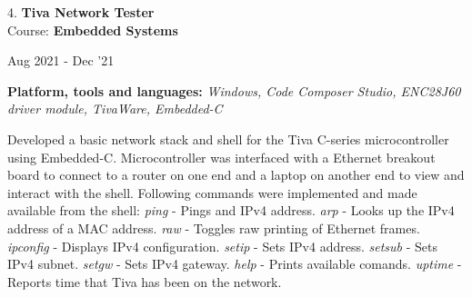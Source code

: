 \documentclass[10pt]{article}
\newenvironment{innerlist}[1][\enskip\textbullet]%
        {\begin{compactitem}[#1]}{\end{compactitem}}
\newenvironment{loneinnerlist}[1][\enskip\textbullet]%
        {\vspace{-\baselineskip}\begin{compactitem}[#1]}
        {\end{compactitem}\vspace{-.6\baselineskip}}
\begin{document}
\begin{loneinnerlist}
\begin{loneinnerlist}
\item[4.]\textbf{Tiva Network Tester} \\ 
\vspace{4pt}
Course: \textbf{Embedded Systems} \\
\vspace*{-28pt} \begin{flushright} Aug 2021 - Dec '21 \end{flushright}
\textbf{Platform, tools and languages:} \emph{Windows, Code Composer Studio, ENC28J60 driver module, TivaWare, Embedded-C}
\vspace*{2pt}
\begin{innerlist} \item Developed a basic network stack and shell for the Tiva C-series microcontroller using Embedded-C. Microcontroller was interfaced with a Ethernet breakout board to connect to a router on one end and a laptop on another end to view and interact with the shell. Following commands were implemented and made available from the shell:
   \subitem \emph{ping} - Pings and IPv4 address.
   \subitem \emph{arp} - Looks up the IPv4 address of a MAC address.
   \subitem \emph{raw} - Toggles raw printing of Ethernet frames.
   \subitem \emph{ipconfig} - Displays IPv4 configuration.
   \subitem \emph{setip} - Sets IPv4 address.
   \subitem \emph{setsub} - Sets IPv4 subnet.
   \subitem \emph{setgw} - Sets IPv4 gateway.
   \subitem \emph{help} - Prints available comands.
   \subitem \emph{uptime} - Reports time that Tiva has been on the network.
\end{innerlist}  \vspace*{4pt}


\end{loneinnerlist}
\end{loneinnerlist}
\end{document}
